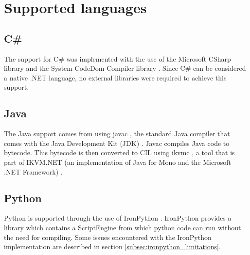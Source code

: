 \section{Supported languages}

\subsection{C\#}
The support for C\# was implemented with the use of the Microsoft CSharp library \cite{MicrosoftCSharp} and the System CodeDom Compiler library \cite{CodeDomCompiler}. Since C\# can be considered a native .NET language, no external libraries were required to achieve this support.

\subsection{Java}
The Java support comes from using javac \cite{Javac}, the standard Java compiler that comes with the Java Development Kit (JDK) \cite{JDK}. Javac compiles Java code to bytecode. This bytecode is then converted to CIL using ikvmc \cite{IKVMC}, a tool that is part of IKVM.NET (an implementation of Java for Mono and the Microsoft .NET Framework) \cite{IKVM.NET}. 

\subsection{Python}
Python is supported through the use of IronPython \cite{IronPython}. IronPython provides a library which contains a ScriptEngine from which python code can run without the need for compiling. Some issues encountered with the IronPython implementation are described in section \ref{subsec:ironpython_limitations}.
